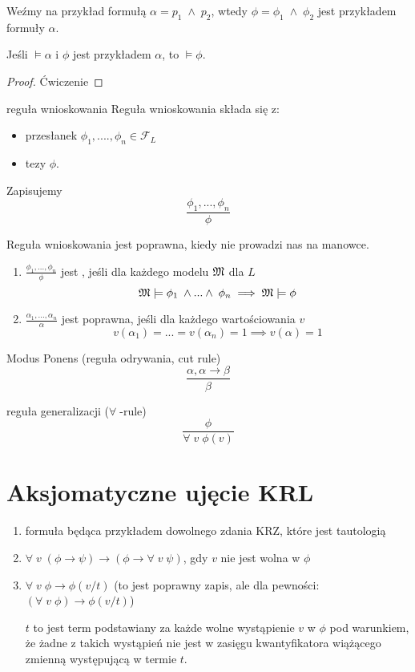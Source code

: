 Weźmy na przykład formułą $\alpha=p_1\;\land\;p_2$, wtedy $\phi=\phi_1\;\land\;\phi_2$ jest przykładem formuły $\alpha$.

\begin{theorem}{}{}
  Jeśli $\models\alpha$ i $\phi$ jest przykładem $\alpha$, to $\models\phi$.
\end{theorem}
\begin{proof}
  Ćwiczenie
\end{proof}

\begin{definition}{reguła wnioskowania}{}
  Reguła wnioskowania składa się z:
  \begin{itemize}
    \item przesłanek $\phi_1,....,\phi_n\in\mathcal{F}_L$
    \item tezy $\phi$.
  \end{itemize}
  Zapisujemy 
  $$\frac{\phi_1,...,\phi_n}{\phi}$$

  Reguła wnioskowania jest poprawna, kiedy nie prowadzi nas na manowce. 
  \begin{enumerate}
    \item $\frac{\phi_1,...,\phi_n}{\phi}$ jest , jeśli dla każdego modelu $\mathfrak{M}$ dla $L$ 
      $$\mathfrak{M}\models\phi_1\;\land...\land\;\phi_n\implies \mathfrak{M}\models\phi$$
    \item $\frac{\alpha_1,...,\alpha_n}{\alpha}$ jest poprawna, jeśli dla każdego wartościowania $v$ 
      $$v(\alpha_1)=...=v(\alpha_n)=1\implies v(\alpha)=1$$
  \end{enumerate}
\end{definition}

\begin{example}[m]
  \item Modus Ponens (reguła odrywania, cut rule) 
    $$\frac{\alpha,\alpha\to \beta}{\beta}$$
  \item reguła generalizacji ($\forall\;$-rule)
    $$\frac{\phi}{\forall\;v\;\phi(v)}$$
\end{example}


\section{Aksjomatyczne ujęcie KRL}
\begin{enumerate}[label=\textbf{\color{green}(A\arabic*)},ref=\color{green!60!black}(A\arabic*), start=0]
  \item\label{A0} formuła będąca przykładem dowolnego zdania KRZ, które jest tautologią
  \item\label{A1} $\forall\;v\;(\phi\to\psi)\to(\phi\to\forall\;v\;\psi)$, gdy $v$ nie jest wolna w $\phi$
  \item\label{A2} $\forall\;v\;\phi\to\phi(v/t)$ (to jest poprawny zapis, ale dla pewności: $(\forall\;v\;\phi)\to\phi(v/t)$)

    $t$ to jest term podstawiany za każde wolne wystąpienie $v$ w $\phi$ pod warunkiem, że żadne z takich wystąpień nie jest w zasięgu kwantyfikatora wiążącego zmienną występującą w termie $t$.
\end{enumerate}

